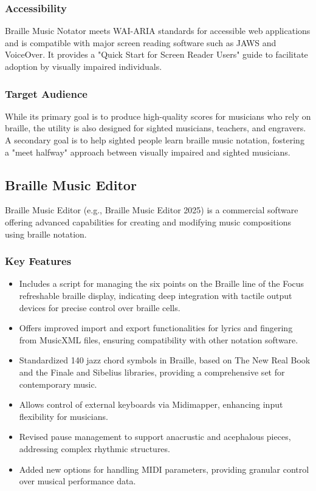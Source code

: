 \subsubsection{Accessibility}
Braille Music Notator meets WAI-ARIA standards for accessible web applications and is compatible with major screen reading software such as JAWS and VoiceOver. \cite{braillemusicnotator} It provides a "Quick Start for Screen Reader Users" guide to facilitate adoption by visually impaired individuals. \cite{braillemusicnotator}

\subsubsection{Target Audience}
While its primary goal is to produce high-quality scores for musicians who rely on braille, the utility is also designed for sighted musicians, teachers, and engravers. A secondary goal is to help sighted people learn braille music notation, fostering a "meet halfway" approach between visually impaired and sighted musicians. \cite{pathstoliteracy-notator, braillemusicnotator}

\subsection{Braille Music Editor}
Braille Music Editor (e.g., Braille Music Editor 2025) is a commercial software offering advanced capabilities for creating and modifying music compositions using braille notation. \cite{braillemusiceditor}

\subsubsection{Key Features}
\begin{itemize}
    \item Includes a script for managing the six points on the Braille line of the Focus refreshable braille display, indicating deep integration with tactile output devices for precise control over braille cells. \cite{braillemusiceditor}
    \item Offers improved import and export functionalities for lyrics and fingering from MusicXML files, ensuring compatibility with other notation software. \cite{braillemusiceditor}
    \item Standardized 140 jazz chord symbols in Braille, based on The New Real Book and the Finale and Sibelius libraries, providing a comprehensive set for contemporary music. \cite{braillemusiceditor}
    \item Allows control of external keyboards via Midimapper, enhancing input flexibility for musicians. \cite{braillemusiceditor}
    \item Revised pause management to support anacrustic and acephalous pieces, addressing complex rhythmic structures. \cite{braillemusiceditor}
    \item Added new options for handling MIDI parameters, providing granular control over musical performance data. \cite{braillemusiceditor}
\end{itemize}

